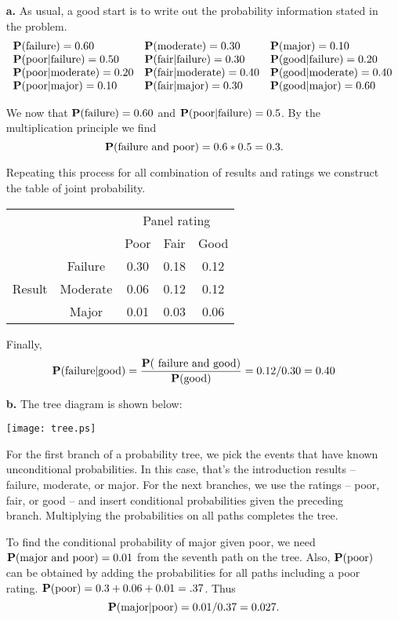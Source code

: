 \documentclass[10pt]{article}
\def\Pr{{\bf P}}
\begin{document}
\begin{itemize}
\item[\bf a.] As usual, a good start is to write out the probability information stated in the problem.
$$\begin{array}{lll}
\Pr(\mbox{failure})=0.60 & \Pr(\mbox{moderate})=0.30 & \Pr(\mbox{major})=0.10\\
\Pr(\mbox{poor$|$failure})=0.50 & \Pr(\mbox{fair$|$failure})=0.30 & \Pr(\mbox{good$|$failure})=0.20\\
\Pr(\mbox{poor$|$moderate})=0.20 & \Pr(\mbox{fair$|$moderate})=0.40 & \Pr(\mbox{good$|$moderate})=0.40\\
\Pr(\mbox{poor$|$major})=0.10 & \Pr(\mbox{fair$|$major})=0.30 & \Pr(\mbox{good$|$major})=0.60
\end{array}$$ 

We now that $\Pr(\mbox{failure})=0.60$ and $\Pr(\mbox{poor$|$failure})=0.5$. By the multiplication principle we find
$$\Pr(\mbox{failure and poor})=0.6*0.5=0.3.$$

Repeating this process for all combination of results and ratings we construct the table of joint probability.
\begin{center}
\begin{tabular}{ccccc}
& & \multicolumn{3}{c}{Panel rating}\\
& & Poor & Fair & Good\\
& Failure & 0.30 & 0.18 & 0.12\\
Result & Moderate & 0.06 & 0.12 & 0.12\\
& Major & 0.01 & 0.03 & 0.06\\
\end{tabular}
\end{center}
Finally, $$\Pr(\mbox{failure$|$good})=\frac{\Pr(\mbox{ failure and good})}{\Pr(\mbox{good})}=0.12/0.30=0.40$$
\item[\bf b.] The tree diagram is shown below:\\
\centerline{\texttt{[image: tree.ps]}}
For the first branch of a probability tree, we pick the events that have known unconditional probabilities. In this case, that's the introduction results -- failure, moderate, or major. For the next branches, we use the ratings -- poor, fair, or good -- and insert conditional probabilities given the preceding branch. Multiplying the probabilities on all paths completes the tree.

To find the conditional probability of major given poor, we need 
$\Pr(\mbox{major and poor})=0.01$ from the seventh path on the tree. Also, 
$\Pr(\mbox{poor})$ can be obtained by adding the probabilities for all paths including a poor rating. $\Pr(\mbox{poor})=0.3+0.06+0.01=.37$. Thus
$$\Pr(\mbox{major$|$poor})=0.01/0.37=0.027.$$
\end{itemize}
\end{document}
